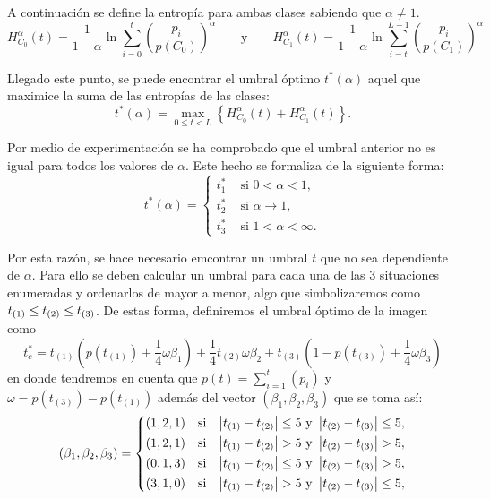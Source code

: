 \documentclass[main]{subfiles}
\begin{document}

A continuación se define la entropía para ambas clases sabiendo que $\alpha\neq 1$.
$$H_{C_0}^{\alpha}(t) = \frac{1}{1-\alpha}\ln \sum_{i=0}^{t}\left(\frac{p_i}{p(C_0)}\right)^\alpha \qquad\text{y}\qquad
H_{C_1}^{\alpha}(t) = \frac{1}{1-\alpha}\ln \sum_{i=t}^{L-1}\left(\frac{p_i}{p(C_1)}\right)^\alpha$$

Llegado este punto, se puede encontrar el umbral óptimo $t^*(\alpha)$ aquel que maximice la suma de las entropías de las clases:
$$t^*(\alpha)=\max_{0\leq t<L}\left\{H_{C_0}^{\alpha}(t)+H_{C_1}^{\alpha}(t)\right\}.$$

Por medio de experimentación se ha comprobado que el umbral anterior no es igual para todos los valores de $\alpha$. Este hecho se formaliza de la siguiente forma:
$$t^*(\alpha)=\left\{\begin{aligned}
    t^*_1 & \text{  si  }0<\alpha<1,\\
    t^*_2 & \text{  si  }\alpha\rightarrow1,\\
    t^*_3 & \text{  si  }1<\alpha<\infty.
\end{aligned}\right.$$

Por esta razón, se hace necesario emcontrar un umbral $t$ que no sea dependiente de $\alpha$. Para ello se deben calcular un umbral para cada una de las 3 situaciones enumeradas y ordenarlos de mayor a menor, algo que simbolizaremos como $t_{(1)}\leq t_{(2)}\leq t_{(3)}$. De estas forma, definiremos el umbral óptimo de la imagen como
$$t^*_c = t_{(1)} \left(p(t_{(1)})+\frac{1}{4}\omega\beta_1\right)
        + \frac{1}{4}t_{(2)}\omega\beta_2
        + t_{(3)} \left(1-p(t_{(3)})+\frac{1}{4}\omega\beta_3\right)$$
en donde tendremos en cuenta que $p(t)=\sum_{i=1}^t(p_i)$ y $\omega=p(t_{(3)})-p(t_{(1)})$ además del vector $(\beta_1, \beta_2, \beta_3)$ que se toma así:
$$(\beta_1, \beta_2, \beta_3) =  \left\{\begin{aligned}
    (1, 2, 1) & \quad\text{si} &\left\vert t_{(1)}-t_{(2)}\right\vert\leq 5 \text{ y } \left\vert t_{(2)}-t_{(3)}\right\vert\leq 5,\\
    (1, 2, 1) & \quad\text{si} &\left\vert t_{(1)}-t_{(2)}\right\vert  >  5 \text{ y } \left\vert t_{(2)}-t_{(3)}\right\vert  >  5,\\
    (0, 1, 3) & \quad\text{si} &\left\vert t_{(1)}-t_{(2)}\right\vert\leq 5 \text{ y } \left\vert t_{(2)}-t_{(3)}\right\vert  >  5,\\
    (3, 1, 0) & \quad\text{si} &\left\vert t_{(1)}-t_{(2)}\right\vert  >  5 \text{ y } \left\vert t_{(2)}-t_{(3)}\right\vert\leq 5,
\end{aligned}\right.$$
\end{document}
